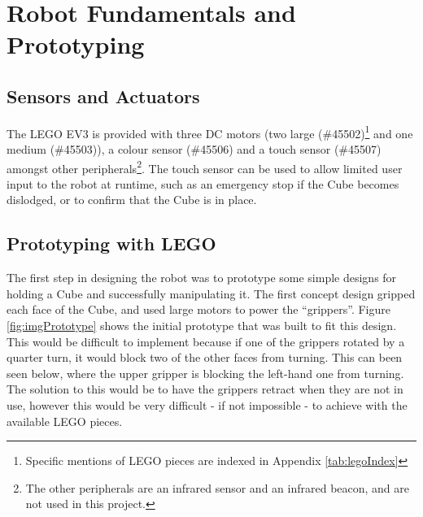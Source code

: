 \documentclass{report}
\newcommand{\legopiece}[1]{(\##1)}
\newcommand{\lego}{LEGO }
\begin{document}
    \section{Robot Fundamentals and Prototyping}
    
    \subsection{Sensors and Actuators}
    
    The \lego EV3 is provided with three DC motors (two large \legopiece{45502}\footnote{Specific mentions of \lego pieces are indexed in Appendix \ref{tab:legoIndex}} and one medium \legopiece{45503}), a colour sensor \legopiece{45506} and a touch sensor \legopiece{45507} amongst other peripherals\footnote{The other peripherals are an infrared sensor and an infrared beacon, and are not used in this project.}. The touch sensor can be used to allow limited user input to the robot at runtime, such as an emergency stop if the Cube becomes dislodged, or to confirm that the Cube is in place.
    
    \subsection{Prototyping with \lego}
    
    The first step in designing the robot was to prototype some simple designs for holding a Cube and successfully manipulating it. The first concept design gripped each face of the Cube, and used large motors to power the \enquote{grippers}. Figure \ref{fig:imgPrototype} shows the initial prototype that was built to fit this design. This would be difficult to implement because if one of the grippers rotated by a quarter turn, it would block two of the other faces from turning. This can been seen below, where the upper gripper is blocking the left-hand one from turning. The solution to this would be to have the grippers retract when they are not in use, however this would be very difficult - if not impossible - to achieve with the available \lego pieces.
    
\end{document}
